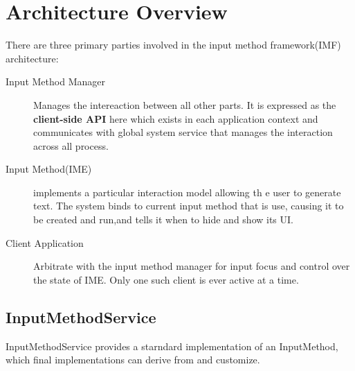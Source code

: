 \documentclass[11pt, a4paper]{book}
\begin{document}
\section{Architecture Overview}
There are three primary parties involved in the input method framework(IMF)
architecture:
\begin{description}
\item [Input Method Manager] Manages the intereaction between all other parts.
It is expressed as the \textbf{client-side API} here which exists in each
application context and communicates with global system service that manages the
interaction across all process.
\item [Input Method(IME)] implements a particular interaction model allowing th
e user to generate text. The system binds to current input method that is use,
causing it to be created and run,and tells it when to hide and show its UI.
\item [Client Application] Arbitrate with the input method manager for input
focus and control over the state of IME. Only one such client is ever active at
a time.
\end{description}
\subsection{InputMethodService}
InputMethodService provides a starndard implementation of an InputMethod, which
final implementations can derive from and customize.
\end{document}
